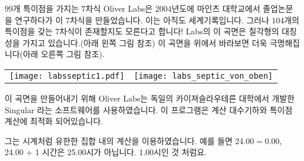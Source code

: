\begin{surferPage}[99개의 특이점]{$99$개 특이점을 가지는 $7$차식}
    Oliver Labs은 $2004$년도에 마인츠 대학교에서 졸업논문을 연구하다가 이 $7$차식을 만들었습니다. 이는 아직도 세계기록입니다. 그러나 $104$개의 특이점을 갖는 $7$차식이 존재할지도 모른다고 합니다! Labs의 이 곡면은 칠각형의 대칭성을 가지고 있습니다.(아래 왼쪽 그림 참조) 이 곡면을 위에서 바라보면 더욱 극명해집니다(아래 오른쪽 그림 참조). 

    \vspace*{-0.3em}
    \begin{center}
      \begin{tabular}{c@{\qquad}c}
        \texttt{[image: labsseptic1.pdf]}
        &
        \texttt{[image: labs\_septic\_von\_oben]}
      \end{tabular}
    \end{center}
    \vspace*{-0.3em}

이 곡면을 만들어내기 위해 Oliver Labs는 독일의 카이져슬라우테른 대학에서 개발한 {\sc Singular} 라는 소프트웨어를 사용하였습니다. 이 프로그램은 계산 대수기하와 특이점 계산에 최적화 되어있습니다. 

그는 시계처럼 유한한 집합 내의 계산을 이용하였습니다. 예를 들면 24.00$=$0.00, 24.00 $+$ 1 시간은 25.00시가 아닙니다. 1.00시인 것 처럼요.
\end{surferPage}
